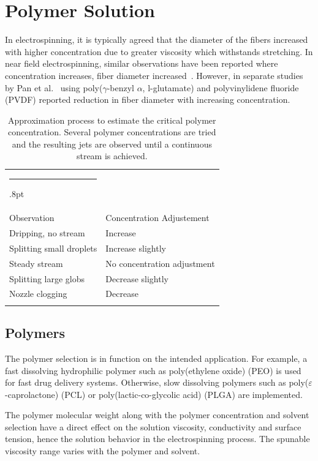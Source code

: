 \documentclass[5p,,preprint,12pt,twocolumn]{elsarticle}
\makeatletter
\def\hlinewd#1{%
  \noalign{\ifnum0=`}\fi\hrule \@height #1%
  \futurelet\reserved@a\@xhline}
\def\tbltoprule{\hlinewd{.8pt}\\[-12pt]}
\def\tblbottomrule{\noalign{\vspace*{6pt}}\hline\noalign{\vspace*{2pt}}}
\def\tblmidrule{\noalign{\vspace*{6pt}}\hline\noalign{\vspace*{2pt}}}
\makeatother
\begin{document}
\section{Polymer Solution}
In electrospinning, it is typically agreed that the diameter of the fibers increased with higher concentration due to greater viscosity which withstands stretching. In near field electrospinning, similar observations have been reported where concentration increases, fiber diameter increased\unskip~\cite{527120:11974306,527120:11974329}. However, in separate studies by Pan et al.\unskip~\cite{527120:11974317,527120:12321129} using poly(\ensuremath{\gamma }-benzyl \ensuremath{\alpha }, l-glutamate) and polyvinylidene fluoride (PVDF) reported reduction in fiber diameter with increasing concentration.
\begin{table}[!htbp]
\caption{{Approximation process to estimate the critical polymer concentration. Several polymer concentrations are tried and the resulting jets are observed until a continuous stream is achieved.} }
\label{tw-8687dd17082c}
\def\arraystretch{1}
\ignorespaces 
\centering 
\begin{tabulary}{\linewidth}{LL}
\tbltoprule Observation & Concentration Adjustement\\
\tblmidrule 
Dripping, no stream &
  Increase\\
Splitting small droplets &
  Increase slightly\\
Steady stream &
  No concentration adjustment\\
Splitting large globs &
  Decrease slightly\\
Nozzle clogging  &
  Decrease\\
\tblbottomrule 
\end{tabulary}\par 
\end{table}




\subsection{Polymers}The polymer selection is in function on the intended application. For example, a fast dissolving hydrophilic polymer such as poly(ethylene oxide) (PEO) is used for fast drug delivery systems. Otherwise, slow dissolving polymers such as poly($\varepsilon $-caprolactone) (PCL) or poly(lactic-co-glycolic acid) (PLGA) are implemented. \unskip~\cite{527120:13082763}

The polymer molecular weight along with the polymer concentration and solvent selection have a direct effect on the solution viscosity, conductivity and surface tension, hence the solution behavior in the electrospinning process. The spunable viscosity range varies with the polymer and solvent. 
\end{document}
